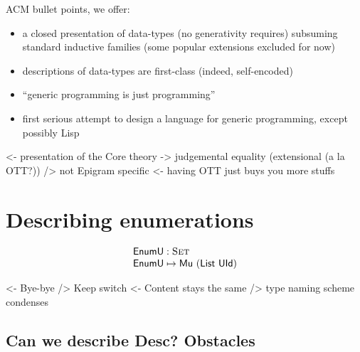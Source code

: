 \documentclass[preprint, authoryear, onecolumn]{sigplanconf}
\newenvironment{structure}{\footnotesize\verbatim}{\endverbatim}
\begin{document}
ACM bullet points, we offer:
\begin{itemize}
\item a closed presentation of data-types (no generativity requires)
  subsuming standard inductive families (some popular extensions
  excluded for now)
\item descriptions of data-types are first-class (indeed,
  self-encoded)
\item ``generic programming is just programming''
\item first serious attempt to design a language for generic
  programming, except possibly Lisp
\end{itemize}

\begin{structure}
<- presentation of the Core theory
    -> judgemental equality (extensional (a la OTT?))
    /> not Epigram specific 
        <- having OTT just buys you more stuffs
\end{structure}












\section{Describing enumerations}

\[\stk{
\EnumU : \Set \\
\EnumU \mapsto \Mu{(\List~\UId)}
}\]


\begin{structure}
<- Bye-bye \spi
    /> Keep switch
<- Content stays the same
    /> type naming scheme condenses
\end{structure}


\subsection{Can we describe Desc? Obstacles}
\end{document}
